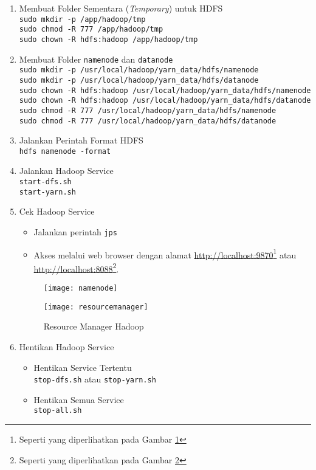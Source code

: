 \documentclass[a4paper]{tufte-handout}
\begin{document}
\begin{enumerate}
\item Membuat Folder Sementara (\textit{Temporary}) untuk HDFS \\
{\tt sudo mkdir -p /app/hadoop/tmp} \\
{\tt sudo chmod -R 777 /app/hadoop/tmp} \\
{\tt sudo chown -R hdfs:hadoop /app/hadoop/tmp}

\item Membuat Folder {\tt namenode} dan {\tt datanode} \\
{\tt sudo mkdir -p /usr/local/hadoop/yarn\_data/hdfs/namenode} \\
{\tt sudo mkdir -p /usr/local/hadoop/yarn\_data/hdfs/datanode} \\
{\tt sudo chown -R hdfs:hadoop /usr/local/hadoop/yarn\_data/hdfs/namenode} \\
{\tt sudo chown -R hdfs:hadoop /usr/local/hadoop/yarn\_data/hdfs/datanode} \\
{\tt sudo chmod -R 777 /usr/local/hadoop/yarn\_data/hdfs/namenode} \\
{\tt sudo chmod -R 777 /usr/local/hadoop/yarn\_data/hdfs/datanode}

\item Jalankan Perintah Format HDFS \\
{\tt hdfs namenode -format}

\item Jalankan Hadoop Service \\
{\tt start-dfs.sh} \\
{\tt start-yarn.sh} \\

\item Cek Hadoop Service
\begin{itemize}
\item Jalankan perintah {\tt jps}
\item Akses melalui web browser dengan alamat \url{http://localhost:9870}\footnote{Seperti yang diperlihatkan pada Gambar \ref{gam:namenode}} atau \url{http://localhost:8088}\footnote{Seperti yang diperlihatkan pada Gambar \ref{gam:resourcemanager}}.
\end{itemize}

\begin{figure}[!ht]
\texttt{[image: namenode]}
\label{gam:namenode}
\end{figure}
\vspace*{-.7cm}
\begin{figure}[!ht]
\texttt{[image: resourcemanager]}
\caption{Resource Manager Hadoop}
\label{gam:resourcemanager}
\end{figure}

\vspace*{-.7cm}
\item Hentikan Hadoop Service
\begin{itemize}
\item Hentikan Service Tertentu \\
{\tt stop-dfs.sh} atau {\tt stop-yarn.sh}
\item Hentikan Semua Service \\
{\tt stop-all.sh}
\end{itemize}
\end{enumerate}
\end{document}
